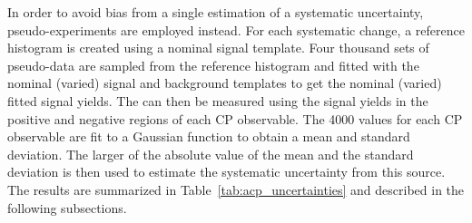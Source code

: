 In order to avoid bias from a single estimation of a systematic uncertainty, pseudo-experiments are employed instead.
For each systematic change, a reference histogram is created using a nominal signal template.
Four thousand sets of pseudo-data are sampled from the reference histogram and fitted with the nominal (varied) signal and background templates to get the nominal (varied) fitted signal yields.
The \Acpprime can then be measured using the signal yields in the positive and negative regions of each CP observable.
The 4000 \Acpprime values for each CP observable are fit to a Gaussian function to obtain a mean and standard deviation.
The larger of the absolute value of the mean and the standard deviation is then used to estimate the systematic uncertainty from this source.
The results are summarized in Table~\ref{tab:acp_uncertainties} and described in the following subsections.

